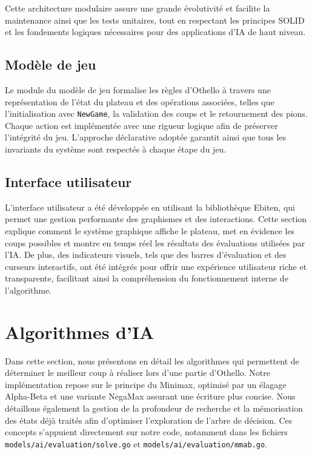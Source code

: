 \documentclass[a4paper,12pt]{article}
\begin{document}
Cette architecture modulaire assure une grande évolutivité et facilite la maintenance ainsi que les tests unitaires, tout en respectant les principes SOLID et les fondements logiques nécessaires pour des applications d'IA de haut niveau.

\subsection{Modèle de jeu}
Le module du modèle de jeu formalise les règles d'Othello à travers une représentation de l'état du plateau et des opérations associées, telles que l'initialisation avec \texttt{NewGame}, la validation des coups et le retournement des pions. Chaque action est implémentée avec une rigueur logique afin de préserver l'intégrité du jeu. L'approche déclarative adoptée garantit ainsi que tous les invariants du système sont respectés à chaque étape du jeu.

\subsection{Interface utilisateur}
L'interface utilisateur a été développée en utilisant la bibliothèque Ebiten, qui permet une gestion performante des graphismes et des interactions. Cette section explique comment le système graphique affiche le plateau, met en évidence les coups possibles et montre en temps réel les résultats des évaluations utilisées par l'IA. De plus, des indicateurs visuels, tels que des barres d'évaluation et des curseurs interactifs, ont été intégrés pour offrir une expérience utilisateur riche et transparente, facilitant ainsi la compréhension du fonctionnement interne de l'algorithme.

\section{Algorithmes d'IA}

Dans cette section, nous présentons en détail les algorithmes qui permettent de déterminer le meilleur coup à réaliser lors d'une partie d'Othello. Notre implémentation repose sur le principe du Minimax, optimisé par un élagage Alpha-Beta et une variante NegaMax assurant une écriture plus concise. Nous détaillons également la gestion de la profondeur de recherche et la mémorisation des états déjà traités afin d'optimiser l'exploration de l'arbre de décision. Ces concepts s'appuient directement sur notre code, notamment dans les fichiers \texttt{models/ai/evaluation/solve.go} et \texttt{models/ai/evaluation/mmab.go}.
\end{document}
